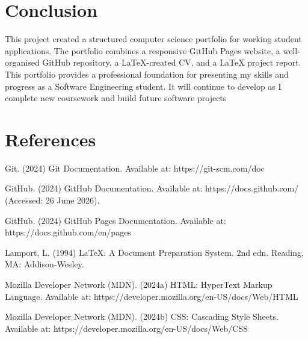 \documentclass[12pt, a4paper]{article}
\begin{document}
\section{Conclusion}
This project created a structured computer science portfolio for working student applications.
The portfolio combines a responsive GitHub Pages website, a well-organised GitHub repository,
a LaTeX-created CV, and a LaTeX project report.
This portfolio provides a professional foundation for presenting my skills and progress as a
Software Engineering student. It will continue to develop as I complete new coursework and
build future software projects



\section{References}

Git. (2024) Git Documentation. Available at: https://git-scm.com/doc 

GitHub. (2024) GitHub Documentation. Available at: https://docs.github.com/ (Accessed: 26 June 2026).

GitHub. (2024) GitHub Pages Documentation. Available at: https://docs.github.com/en/pages 

Lamport, L. (1994) LaTeX: A Document Preparation System. 2nd edn. Reading, MA: Addison-Wesley.

Mozilla Developer Network (MDN). (2024a) HTML: HyperText Markup Language. Available at: https://developer.mozilla.org/en-US/docs/Web/HTML

Mozilla Developer Network (MDN). (2024b) CSS: Cascading Style Sheets. Available at: https://developer.mozilla.org/en-US/docs/Web/CSS 
\end{document}
